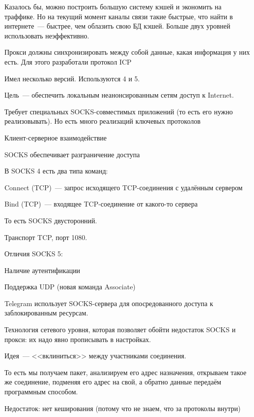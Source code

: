 Казалось бы, можно построить большую систему кэшей и экономить на траффике. Но на текущий момент каналы связи такие быстрые, что найти в интернете~--- быстрее, чем облазить свою БД кэшей. Больше двух уровней использовать неэффективно.

Прокси должны синхронизировать между собой данные, какая информация у них есть. Для этого разработали протокол ICP


Имел несколько версий. Используются 4 и 5.

Цель~--- обеспечить локальным неанонсированным сетям доступ к Internet.

Требует специальных SOCKS-совместимых приложений (то есть его нужно реализовывать). Но есть много реализаций ключевых протоколов

Клиент-серверное взаимодействие

SOCKS обеспечивает разграничение доступа

В SOCKS 4 есть два типа команд:
\begin{MyItemize}
    \item Connect (TCP)~--- запрос исходящего TCP-соединения с удалённым сервером
    \item Bind (TCP)~--- входящее TCP-соединение от какого-то сервера
\end{MyItemize}

То есть SOCKS двусторонний.

Транспорт TCP, порт 1080.

Отличия SOCKS 5:
\begin{MyItemize}
    \item Наличие аутентификации
    \item Поддержка UDP (новая команда Associate)
\end{MyItemize}

Telegram использует SOCKS-сервера для опосредованного доступа к заблокированным ресурсам.


Технология сетевого уровня, которая позволяет обойти недостаток SOCKS и прокси: их надо явно прописывать в настройках.

Идея~--- <<вклиниться>> между участниками соединения.

То есть мы получаем пакет, анализируем его адрес назначения, открываем такое же соединение, подменяя его адрес на свой, а обратно данные передаём программным способом.

Недостаток: нет кеширования (потому что не знаем, что за протоколы внутри)

